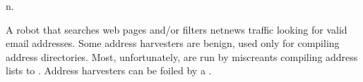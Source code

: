  n.

A robot that searches web pages and/or filters netnews traffic looking for valid email addresses. Some address harvesters are benign, used
only for compiling address directories. Most, unfortunately, are run by miscreants compiling address lists to . Address
harvesters can be foiled by a .

